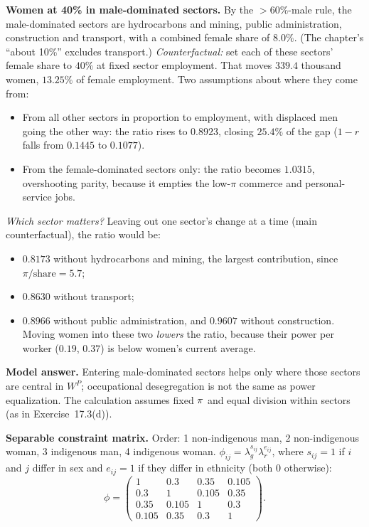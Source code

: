 \documentclass[../solutions_manual.tex]{subfiles}
\begin{document}
 \textbf{Women at 40\% in male-dominated sectors.} By the $>60\%$-male rule, the male-dominated sectors are hydrocarbons and mining, public administration, construction and transport, with a combined female share of $8.0\%$. (The chapter's ``about 10\%'' excludes transport.) \emph{Counterfactual:} set each of these sectors' female share to $40\%$ at fixed sector employment. That moves $339.4$ thousand women, $13.25\%$ of female employment. Two assumptions about where they come from:
\begin{itemize}
\item From all other sectors in proportion to employment, with displaced men going the other way: the ratio rises to $0.8923$, closing $25.4\%$ of the gap ($1 - r$ falls from $0.1445$ to $0.1077$).
\item From the female-dominated sectors only: the ratio becomes $1.0315$, overshooting parity, because it empties the low-$\pi$ commerce and personal-service jobs.
\end{itemize}
\emph{Which sector matters?} Leaving out one sector's change at a time (main counterfactual), the ratio would be:
\begin{itemize}
\item $0.8173$ without hydrocarbons and mining, the largest contribution, since $\pi/\text{share} = 5.7$;
\item $0.8630$ without transport;
\item $0.8966$ without public administration, and $0.9607$ without construction. Moving women into these two \emph{lowers} the ratio, because their power per worker ($0.19$, $0.37$) is below women's current average.
\end{itemize}
\textbf{Model answer.} Entering male-dominated sectors helps only where those sectors are central in $W^P$; occupational desegregation is not the same as power equalization. The calculation assumes fixed $\pi$ and equal division within sectors (as in Exercise~17.3(d)).


 \textbf{Separable constraint matrix.} Order: 1 non-indigenous man, 2 non-indigenous woman, 3 indigenous man, 4 indigenous woman. $\phi_{ij} = \lambda_g^{s_{ij}}\lambda_r^{e_{ij}}$, where $s_{ij} = 1$ if $i$ and $j$ differ in sex and $e_{ij} = 1$ if they differ in ethnicity (both $0$ otherwise):
\[
\phi = \begin{pmatrix}
1 & 0.3 & 0.35 & 0.105\\
0.3 & 1 & 0.105 & 0.35\\
0.35 & 0.105 & 1 & 0.3\\
0.105 & 0.35 & 0.3 & 1\end{pmatrix}.
\]
\end{document}
